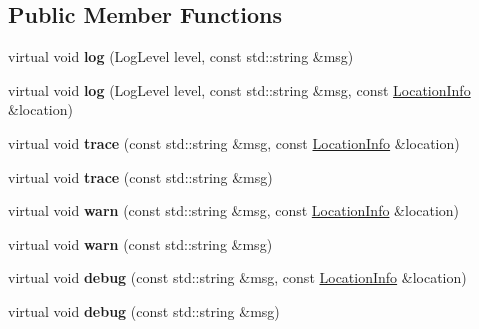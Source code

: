 \subsection*{Public Member Functions}
\begin{DoxyCompactItemize}
\item 
\mbox{\label{classdaq_1_1Logger_aa52da3e8b7b252eafe072abb70ed0254}} 
virtual void {\bfseries log} (Log\+Level level, const std\+::string \&msg)
\item 
\mbox{\label{classdaq_1_1Logger_a66d88aa3977bb0798d37de3a5f5cbe46}} 
virtual void {\bfseries log} (Log\+Level level, const std\+::string \&msg, const \hyperlink{classdaq_1_1LocationInfo}{Location\+Info} \&location)
\item 
\mbox{\label{classdaq_1_1Logger_afb40eba1c380719e6fcb3dc3ce0ae90e}} 
virtual void {\bfseries trace} (const std\+::string \&msg, const \hyperlink{classdaq_1_1LocationInfo}{Location\+Info} \&location)
\item 
\mbox{\label{classdaq_1_1Logger_a079747d1fa90c58673e44b171736b170}} 
virtual void {\bfseries trace} (const std\+::string \&msg)
\item 
\mbox{\label{classdaq_1_1Logger_ad823f38b9fb4ec7b6695340a3dc5f0c5}} 
virtual void {\bfseries warn} (const std\+::string \&msg, const \hyperlink{classdaq_1_1LocationInfo}{Location\+Info} \&location)
\item 
\mbox{\label{classdaq_1_1Logger_aaddf75d2c1f42d29ca6259ccd043d100}} 
virtual void {\bfseries warn} (const std\+::string \&msg)
\item 
\mbox{\label{classdaq_1_1Logger_ae2a3531f3bbe78200ebb7b831bfc9a81}} 
virtual void {\bfseries debug} (const std\+::string \&msg, const \hyperlink{classdaq_1_1LocationInfo}{Location\+Info} \&location)
\item 
\mbox{\label{classdaq_1_1Logger_ad6bf5d2c6ebfb40010af983244d73a89}} 
virtual void {\bfseries debug} (const std\+::string \&msg)
\item 
\mbox{\label{classdaq_1_1Logger_ae004f467f1dd4fc13bcc0299cf0e1d18}} 

\end{DoxyCompactItemize}
